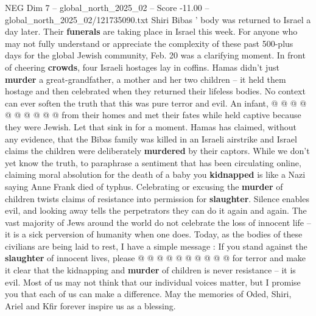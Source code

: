 \begin{textsample}{NEG Dim 7 – global\_north\_2025\_02 – Score -11.00 – global\_north\_2025\_02/121735090.txt}
Shiri Bibas ' body was returned to Israel a day later.
Their \textbf{funerals} are taking place in Israel this week.
For anyone who may not fully understand or appreciate the complexity of these past 500-plus days for the global Jewish community, Feb. 20 was a clarifying moment.
In front of cheering \textbf{crowds}, four Israeli hostages lay in coffins.
Hamas didn't just \textbf{murder} a great-grandfather, a mother and her two children -- it held them hostage and then celebrated when they returned their lifeless bodies.
No context can ever soften the truth that this was pure terror and evil.
An infant, @ @ @ @ @ @ @ @ @ @ from their homes and met their fates while held captive because they were Jewish.
Let that sink in for a moment.
Hamas has claimed, without any evidence, that the Bibas family was killed in an Israeli airstrike and Israel claims the children were deliberately \textbf{murdered} by their captors.
While we don't yet know the truth, to paraphrase a sentiment that has been circulating online, claiming moral absolution for the death of a baby you \textbf{kidnapped} is like a Nazi saying Anne Frank died of typhus.
Celebrating or excusing the \textbf{murder} of children twists claims of resistance into permission for \textbf{slaughter}.
Silence enables evil, and looking away tells the perpetrators they can do it again and again.
The vast majority of Jews around the world do not celebrate the loss of innocent life -- it is a sick perversion of humanity when one does.
Today, as the bodies of these civilians are being laid to rest, I have a simple message : If you stand against the \textbf{slaughter} of innocent lives, please @ @ @ @ @ @ @ @ @ @ for terror and make it clear that the kidnapping and \textbf{murder} of children is never resistance -- it is evil.
Most of us may not think that our individual voices matter, but I promise you that each of us can make a difference.
May the memories of Oded, Shiri, Ariel and Kfir forever inspire us as a blessing.

\end{textsample}
